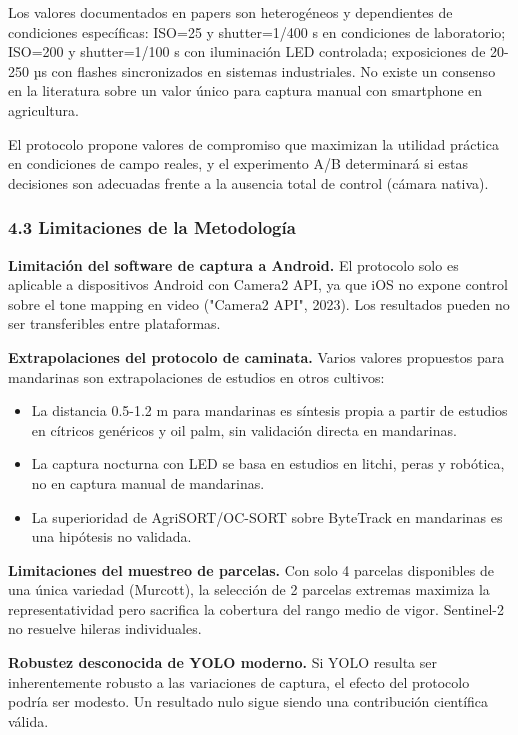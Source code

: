 Los valores documentados en papers son heterogéneos y dependientes de condiciones específicas: ISO=25 y shutter=1/400 s en condiciones de laboratorio; ISO=200 y shutter=1/100 s con iluminación LED controlada; exposiciones de 20-250 µs con flashes sincronizados en sistemas industriales. No existe un consenso en la literatura sobre un valor único para captura manual con smartphone en agricultura.


El protocolo propone valores de compromiso que maximizan la utilidad práctica en condiciones de campo reales, y el experimento A/B determinará si estas decisiones son adecuadas frente a la ausencia total de control (cámara nativa).


\subsubsection{4.3 Limitaciones de la Metodología}


\textbf{Limitación del software de captura a Android.} El protocolo solo es aplicable a dispositivos Android con Camera2 API, ya que iOS no expone control sobre el tone mapping en video ("Camera2 API", 2023). Los resultados pueden no ser transferibles entre plataformas.


\textbf{Extrapolaciones del protocolo de caminata.} Varios valores propuestos para mandarinas son extrapolaciones de estudios en otros cultivos:

\begin{itemize}
\item La distancia 0.5-1.2 m para mandarinas es síntesis propia a partir de estudios en cítricos genéricos y oil palm, sin validación directa en mandarinas.
\item La captura nocturna con LED se basa en estudios en litchi, peras y robótica, no en captura manual de mandarinas.
\item La superioridad de AgriSORT/OC-SORT sobre ByteTrack en mandarinas es una hipótesis no validada.
\end{itemize}

\textbf{Limitaciones del muestreo de parcelas.} Con solo 4 parcelas disponibles de una única variedad (Murcott), la selección de 2 parcelas extremas maximiza la representatividad pero sacrifica la cobertura del rango medio de vigor. Sentinel-2 no resuelve hileras individuales.


\textbf{Robustez desconocida de YOLO moderno.} Si YOLO resulta ser inherentemente robusto a las variaciones de captura, el efecto del protocolo podría ser modesto. Un resultado nulo sigue siendo una contribución científica válida.


